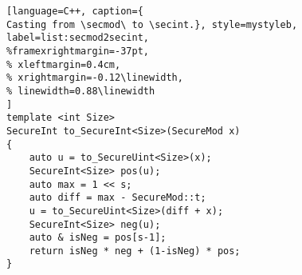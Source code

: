 \begin{figure}[!t]
\begin{minipage}{\linewidth}
\begin{lstlisting}[language=C++, caption={
Casting from \secmod\ to \secint.}, style=mystyleb, label=list:secmod2secint,
%framexrightmargin=-37pt,
% xleftmargin=0.4cm,
% xrightmargin=-0.12\linewidth,
% linewidth=0.88\linewidth
]
template <int Size>
SecureInt to_SecureInt<Size>(SecureMod x)
{
    auto u = to_SecureUint<Size>(x);
    SecureInt<Size> pos(u);
    auto max = 1 << s;
    auto diff = max - SecureMod::t;
    u = to_SecureUint<Size>(diff + x);
    SecureInt<Size> neg(u);
    auto & isNeg = pos[s-1];
    return isNeg * neg + (1-isNeg) * pos;
}
\end{lstlisting}
\end{minipage}
\vspace{-0.5cm} 

\end{figure}
